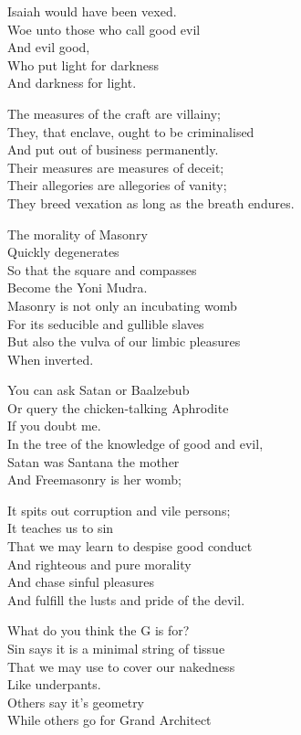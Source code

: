 \documentclass[
]{book}
\begin{document}
Isaiah would have been vexed.\\
Woe unto those who call good evil\\
And evil good,\\
Who put light for darkness\\
And darkness for light.

The measures of the craft are villainy;\\
They, that enclave, ought to be criminalised\\
And put out of business permanently.\\
Their measures are measures of deceit;\\
Their allegories are allegories of vanity;\\
They breed vexation as long as the breath endures.

The morality of Masonry\\
Quickly degenerates\\
So that the square and compasses\\
Become the Yoni Mudra.\\
Masonry is not only an incubating womb\\
For its seducible and gullible slaves\\
But also the vulva of our limbic pleasures\\
When inverted.

You can ask Satan or Baalzebub\\
Or query the chicken-talking Aphrodite\\
If you doubt me.\\
In the tree of the knowledge of good and evil,\\
Satan was Santana the mother\\
And Freemasonry is her womb;

It spits out corruption and vile persons;\\
It teaches us to sin\\
That we may learn to despise good conduct\\
And righteous and pure morality\\
And chase sinful pleasures\\
And fulfill the lusts and pride of the devil.

What do you think the G is for?\\
Sin says it is a minimal string of tissue\\
That we may use to cover our nakedness\\
Like underpants.\\
Others say it's geometry\\
While others go for Grand Architect
\end{document}
